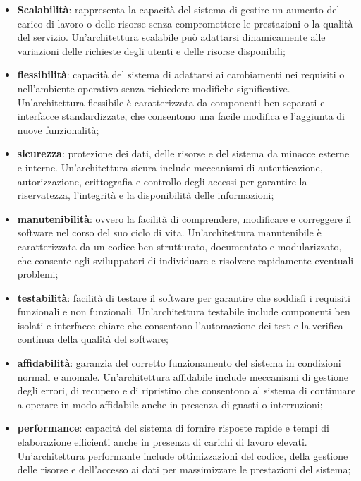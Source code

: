 \begin{itemize}
	\item \textbf{Scalabilità}: rappresenta la capacità del sistema di gestire un aumento del carico di lavoro o delle risorse senza compromettere le prestazioni o la qualità del servizio. Un'architettura scalabile può adattarsi dinamicamente alle variazioni delle richieste degli utenti e delle risorse disponibili;
	\item \textbf{flessibilità}: capacità del sistema di adattarsi ai cambiamenti nei requisiti o nell'ambiente operativo senza richiedere modifiche significative. Un'architettura flessibile è caratterizzata da componenti ben separati e interfacce standardizzate, che consentono una facile modifica e l'aggiunta di nuove funzionalità;
	\item \textbf{sicurezza}: protezione dei dati, delle risorse e del sistema da minacce esterne e interne. Un'architettura sicura include meccanismi di autenticazione, autorizzazione, crittografia e controllo degli accessi per garantire la riservatezza, l'integrità e la disponibilità delle informazioni;
	\item \textbf{manutenibilità}: ovvero la facilità di comprendere, modificare e correggere il software nel corso del suo ciclo di vita. Un'architettura manutenibile è caratterizzata da un codice ben strutturato, documentato e modularizzato, che consente agli sviluppatori di individuare e risolvere rapidamente eventuali problemi;
	\item \textbf{testabilità}: facilità di testare il software per garantire che soddisfi i requisiti funzionali e non funzionali. Un'architettura testabile include componenti ben isolati e interfacce chiare che consentono l'automazione dei test e la verifica continua della qualità del software;
	\item \textbf{affidabilità}: garanzia del corretto funzionamento del sistema in condizioni normali e anomale. Un'architettura affidabile include meccanismi di gestione degli errori, di recupero e di ripristino che consentono al sistema di continuare a operare in modo affidabile anche in presenza di guasti o interruzioni;
	\item \textbf{performance}: capacità del sistema di fornire risposte rapide e tempi di elaborazione efficienti anche in presenza di carichi di lavoro elevati. Un'architettura performante include ottimizzazioni del codice, della gestione delle risorse e dell'accesso ai dati per massimizzare le prestazioni del sistema;

\end{itemize}
